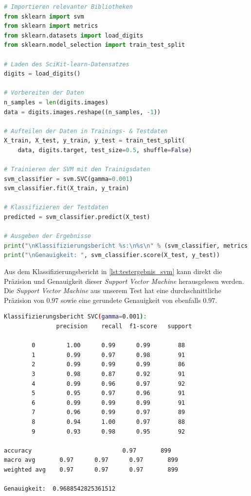 \begin{minipage}{\textwidth}
	\begin{lstlisting}[language=Python, caption=Pythoncode zum Testen der SVM, label=lst:test_svm]
# Importieren relevanter Bibliotheken
from sklearn import svm
from sklearn import metrics
from sklearn.datasets import load_digits
from sklearn.model_selection import train_test_split

# Laden des SciKit-learn-Datensatzes
digits = load_digits()

# Vorbereiten der Daten
n_samples = len(digits.images)
data = digits.images.reshape((n_samples, -1))

# Aufteilen der Daten in Trainings- & Testdaten
X_train, X_test, y_train, y_test = train_test_split(
    data, digits.target, test_size=0.5, shuffle=False)

# Trainieren der SVM mit den Trainigsdaten
svm_classifier = svm.SVC(gamma=0.001)
svm_classifier.fit(X_train, y_train)

# Klassifizieren der Testdaten
predicted = svm_classifier.predict(X_test)

# Ausgeben der Ergebnisse
print("\nKlassifizierungsbericht %s:\n%s\n" % (svm_classifier, metrics.classification_report(y_test, predicted)))
print("\nGenauigkeit: ", svm_classifier.score(X_test, y_test))
	\end{lstlisting}
\end{minipage}

Aus dem Klassifizierungsbericht in \ref{lst:testergebnis_svm} kann direkt die Präzision und Genauigkeit dieser \textit{Support Vector Machine} 
herausgelesen werden. Die \textit{Support Vector Machine} aus unserem Test hat eine durchschnittliche Präzision von $0.97$ sowie eine 
gerundete Genauigkeit von ebenfalls $0.97$.

\begin{minipage}{\textwidth}
	\begin{lstlisting}[language=Bash, caption=Testergebnisse der SVM, label=lst:testergebnis_svm]
Klassifizierungsbericht SVC(gamma=0.001):
			   precision    recall  f1-score   support

		0         1.00      0.99      0.99        88
		1         0.99      0.97      0.98        91
		2         0.99      0.99      0.99        86
		3         0.98      0.87      0.92        91
		4         0.99      0.96      0.97        92
		5         0.95      0.97      0.96        91
		6         0.99      0.99      0.99        91
		7         0.96      0.99      0.97        89
		8         0.94      1.00      0.97        88
		9         0.93      0.98      0.95        92

accuracy                          0.97       899
macro avg    	0.97      0.97      0.97       899
weighted avg 	0.97      0.97      0.97       899

Genauigkeit:  0.9688542825361512
	\end{lstlisting}
\end{minipage}

